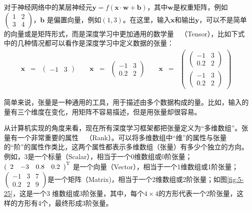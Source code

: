 \parinterval 对于神经网络中的某层神经元$ \mathbf y=f(\mathbf x\cdot \mathbf w+\mathbf b) $，其中$ \mathbf w $是权重矩阵，例如$ \begin{pmatrix} 1 & 2\\ 3 & 4\end{pmatrix} $，$ \mathbf b $ 是偏置向量，例如$ (1,3) $。在这里，输入$ \mathbf x $和输出$ \mathbf y $，可以不是简单的向量或是矩阵形式，而是深度学习中更加通用的数学量\ \dash \ {\small{}}（Tensor），比如下式中的几种情况都可以看作是深度学习中定义数据的张量：
\begin{eqnarray}
\mathbf x&=&\begin{pmatrix} -1 & 3\end{pmatrix}\qquad
\mathbf x\;\;=\;\;\begin{pmatrix} -1 & 3\\ 0.2 & 2\end{pmatrix}\qquad
\mathbf x\;\;=\;\;\begin{pmatrix}{\begin{pmatrix} -1 & 3\\ 0.2 & 2\end{pmatrix}}\\{\begin{pmatrix} -1 & 3\\ 0.2 & 2\end{pmatrix}}\end{pmatrix} \nonumber
\label{}
\end{eqnarray}

\parinterval 简单来说，张量是一种通用的工具，用于描述由多个数据构成的量。比如，输入的量有三个维度在变化，用矩阵不容易描述，但是用张量却很容易。

\parinterval 从计算机实现的角度来看，现在所有深度学习框架都把张量定义为``多维数组''。张量有一个非常重要的属性\ \dash \ {\small{}}（Rank）。可以将多维数组中``维''的属性与张量的``阶''的属性作类比，这两个属性都表示多维数组（张量）有多少个独立的方向。例如，3是一个标量（Scalar），相当于一个0维数组或0阶张量；$ {(\begin{array}{cccc} 2 & -3 & 0.8 & 0.2\end{array})}^{\rm T} $ 是一个向量（Vector），相当于一个1维数组或1阶张量；$ \begin{pmatrix} -1 & 3 & 7\\ 0.2 & 2 & 9\end{pmatrix} $是一个矩阵（Matrix)，相当于一个2维数组或2阶张量；如图\ref{fig:5-25}，这是一个3 维数组或3阶张量，其中，每个$4 \times 4$的方形代表一个2阶张量，这样的方形有4个，最终形成3阶张量。

